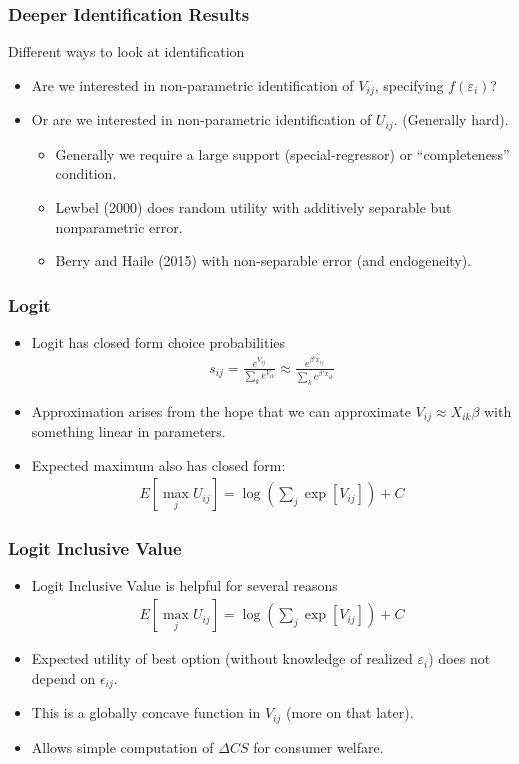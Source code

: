 \documentclass[xcolor=pdftex,dvipsnames,table,mathserif]{beamer}
\begin{document}
\begin{frame}
\frametitle{Deeper Identification Results}
Different ways to look at identification
\begin{itemize}
\item Are we interested in non-parametric identification of $V_{ij}$, specifying $f(\varepsilon_i)$?
\item Or are we interested in non-parametric identification of $U_{ij}$. (Generally hard).
\begin{itemize}
\item Generally we require a large support (special-regressor) or ``completeness'' condition.
\item Lewbel (2000) does random utility with additively separable but nonparametric error.\item Berry and Haile (2015) with non-separable error (and endogeneity).
\end{itemize}
\end{itemize}
\end{frame}


\begin{frame}
\frametitle{Logit}
\begin{itemize}
\item Logit has closed form choice probabilities
\begin{eqnarray*}
s_{ij} = \frac{e^{V_{ij}}}{\sum_k e^{V_{ik}}} \approx \frac{e^{\beta' x_{ij}}}{\sum_k e^{\beta' x_{ik}}}
\end{eqnarray*}
\item Approximation arises from the hope that we can approximate $V_{ij} \approx  X_{ik} \beta$ with something linear in parameters.
\item Expected maximum also has closed form:
\begin{eqnarray*}
E[\max_j U_{ij}] = \log \left(\sum_j \exp[V_{ij}] \right) + C
\end{eqnarray*}
\end{itemize}
\end{frame}


\begin{frame}
\frametitle{Logit Inclusive Value}
\begin{itemize}
\item Logit Inclusive Value is helpful for several reasons
\begin{eqnarray*}
E[\max_j U_{ij}] = \log \left(\sum_j \exp[V_{ij}] \right) + C
\end{eqnarray*}
\item Expected utility of best option (without knowledge of realized $\varepsilon_i$) does not depend on $\epsilon_{ij}$.
\item This is a globally concave function in $V_{ij}$ (more on that later).
\item Allows simple computation of $\Delta CS$ for consumer welfare.
\end{itemize}
\end{frame}
\end{document}
